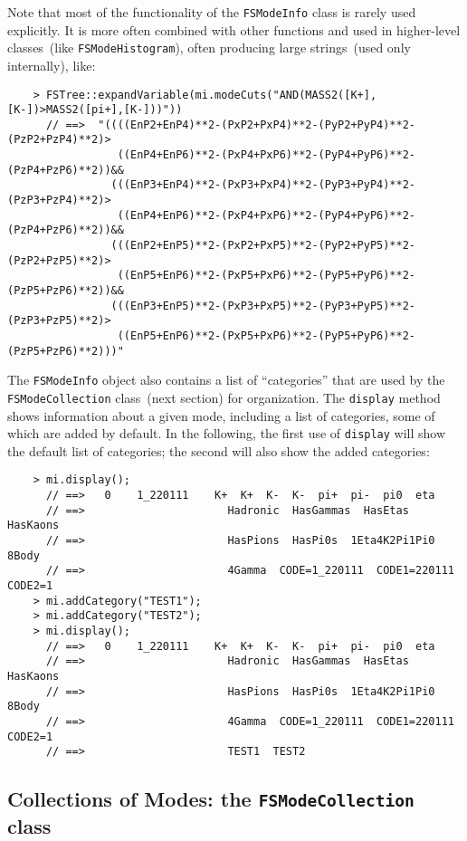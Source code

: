 \documentclass[11pt]{article}
\begin{document}
Note that most of the functionality of the {\tt FSModeInfo} class is rarely used explicitly.  It is more often combined with other functions and used in higher-level classes~(like {\tt FSModeHistogram}), often producing large strings~(used only internally), like:
\begin{verbatim}
    > FSTree::expandVariable(mi.modeCuts("AND(MASS2([K+],[K-])>MASS2([pi+],[K-]))"))
      // ==>  "((((EnP2+EnP4)**2-(PxP2+PxP4)**2-(PyP2+PyP4)**2-(PzP2+PzP4)**2)>
                 ((EnP4+EnP6)**2-(PxP4+PxP6)**2-(PyP4+PyP6)**2-(PzP4+PzP6)**2))&&
                (((EnP3+EnP4)**2-(PxP3+PxP4)**2-(PyP3+PyP4)**2-(PzP3+PzP4)**2)>
                 ((EnP4+EnP6)**2-(PxP4+PxP6)**2-(PyP4+PyP6)**2-(PzP4+PzP6)**2))&&
                (((EnP2+EnP5)**2-(PxP2+PxP5)**2-(PyP2+PyP5)**2-(PzP2+PzP5)**2)>
                 ((EnP5+EnP6)**2-(PxP5+PxP6)**2-(PyP5+PyP6)**2-(PzP5+PzP6)**2))&&
                (((EnP3+EnP5)**2-(PxP3+PxP5)**2-(PyP3+PyP5)**2-(PzP3+PzP5)**2)>
                 ((EnP5+EnP6)**2-(PxP5+PxP6)**2-(PyP5+PyP6)**2-(PzP5+PzP6)**2)))"
\end{verbatim} 

The {\tt FSModeInfo} object also contains a list of ``categories'' that are used by the {\tt FSModeCollection} class~(next section) for organization.  The {\tt display} method shows information about a given mode, including a list of categories, some of which are added by default.  In the following, the first use of {\tt display} will show the default list of categories; the second will also show the added categories:
\begin{verbatim}
    > mi.display();
      // ==>   0    1_220111    K+  K+  K-  K-  pi+  pi-  pi0  eta 
      // ==>                      Hadronic  HasGammas  HasEtas  HasKaons  
      // ==>                      HasPions  HasPi0s  1Eta4K2Pi1Pi0  8Body  
      // ==>                      4Gamma  CODE=1_220111  CODE1=220111  CODE2=1
    > mi.addCategory("TEST1");
    > mi.addCategory("TEST2");
    > mi.display();
      // ==>   0    1_220111    K+  K+  K-  K-  pi+  pi-  pi0  eta 
      // ==>                      Hadronic  HasGammas  HasEtas  HasKaons  
      // ==>                      HasPions  HasPi0s  1Eta4K2Pi1Pi0  8Body  
      // ==>                      4Gamma  CODE=1_220111  CODE1=220111  CODE2=1
      // ==>                      TEST1  TEST2
\end{verbatim}

\subsection{Collections of Modes: the {\tt FSModeCollection} class}
\label{sec:modecollection}
\end{document}
